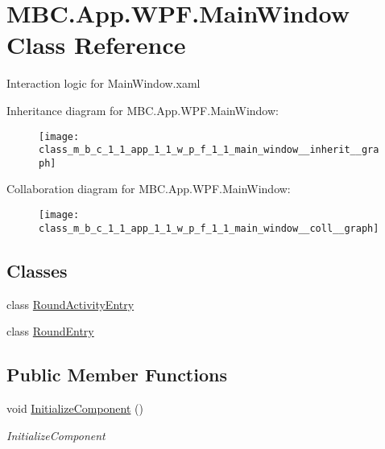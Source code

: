 \hypertarget{class_m_b_c_1_1_app_1_1_w_p_f_1_1_main_window}{\section{M\-B\-C.\-App.\-W\-P\-F.\-Main\-Window Class Reference}
\label{class_m_b_c_1_1_app_1_1_w_p_f_1_1_main_window}
}


Interaction logic for Main\-Window.\-xaml  




Inheritance diagram for M\-B\-C.\-App.\-W\-P\-F.\-Main\-Window\-:
\nopagebreak
\begin{figure}[H]
\begin{center}
\leavevmode
\texttt{[image: class\_m\_b\_c\_1\_1\_app\_1\_1\_w\_p\_f\_1\_1\_main\_window\_\_inherit\_\_graph]}
\end{center}
\end{figure}


Collaboration diagram for M\-B\-C.\-App.\-W\-P\-F.\-Main\-Window\-:
\nopagebreak
\begin{figure}[H]
\begin{center}
\leavevmode
\texttt{[image: class\_m\_b\_c\_1\_1\_app\_1\_1\_w\_p\_f\_1\_1\_main\_window\_\_coll\_\_graph]}
\end{center}
\end{figure}
\subsection*{Classes}
\begin{DoxyCompactItemize}
\item 
class \hyperlink{class_m_b_c_1_1_app_1_1_w_p_f_1_1_main_window_1_1_round_activity_entry}{Round\-Activity\-Entry}
\item 
class \hyperlink{class_m_b_c_1_1_app_1_1_w_p_f_1_1_main_window_1_1_round_entry}{Round\-Entry}
\end{DoxyCompactItemize}
\subsection*{Public Member Functions}
\begin{DoxyCompactItemize}
\item 
void \hyperlink{class_m_b_c_1_1_app_1_1_w_p_f_1_1_main_window_ad1c470e1c18333965a505d3752d7e89f}{Initialize\-Component} ()
\begin{DoxyCompactList}\small\item\em Initialize\-Component \end{DoxyCompactList}\end{DoxyCompactItemize}



